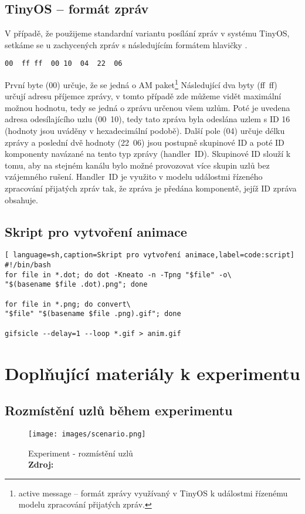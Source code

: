 \documentclass[11pt,final,twoside]{fithesis2}
\newcommand*{\captionsource}[2]{%
  \caption[{#1}]{%
    #1%
    \\\hspace{\linewidth}%
    \textbf{Zdroj:} #2%
  }%
}
\begin{document}
\section{TinyOS -- formát zpráv} \label{sec:msg}

V případě, že použijeme standardní variantu posílání zpráv v systému TinyOS, setkáme se u zachycených zpráv s následujícím formátem hlavičky \cite{TinyOSmsgs}.

\begin{verbatim}
00  ff ff  00 10  04  22  06
\end{verbatim}

První byte (00) určuje, že se jedná o AM paket\footnote{active message -- formát zprávy využívaný v TinyOS k událostmi řízenému modelu zpracování přijatých zpráv.}
Následující dva byty (ff~ff) určují adresu příjemce zprávy, v tomto případě zde můžeme vidět maximální možnou hodnotu, tedy se jedná o zprávu určenou všem uzlům.
Poté je uvedena adresa odesílajícího uzlu (00~10), tedy tato zpráva byla odeslána uzlem s ID 16 (hodnoty jsou uváděny v hexadecimální podobě). Další pole (04) určuje délku zprávy
a poslední dvě hodnoty (22~06) jsou postupně skupinové ID a poté ID komponenty navázané na tento typ zprávy (handler~ID). Skupinové ID slouží k tomu, aby na stejném kanálu bylo možné provozovat více
skupin uzlů bez vzájemného rušení. Handler~ID je využito v modelu událostmi řízeného zpracování přijatých zpráv tak, že zpráva je předána komponentě, jejíž ID zpráva obsahuje. 

\setcounter{lstlisting}{1}
\section{Skript pro vytvoření animace}
\begin{lstlisting}[ language=sh,caption=Skript pro vytvoření animace,label=code:script]
#!/bin/bash
for file in *.dot; do dot -Kneato -n -Tpng "$file" -o\
"$(basename $file .dot).png"; done

for file in *.png; do convert\
"$file" "$(basename $file .png).gif"; done

gifsicle --delay=1 --loop *.gif > anim.gif

\end{lstlisting}


\chapter{Doplňující materiály k experimentu}

\section{Rozmístění uzlů během experimentu}
\begin{figure}[h]
     \centering
     \texttt{[image: images/scenario.png]}
     \captionsource{Experiment - rozmístění uzlů}{\cite{Svenda2014}}
     \label{img:scenario}
\end{figure}
\end{document}

